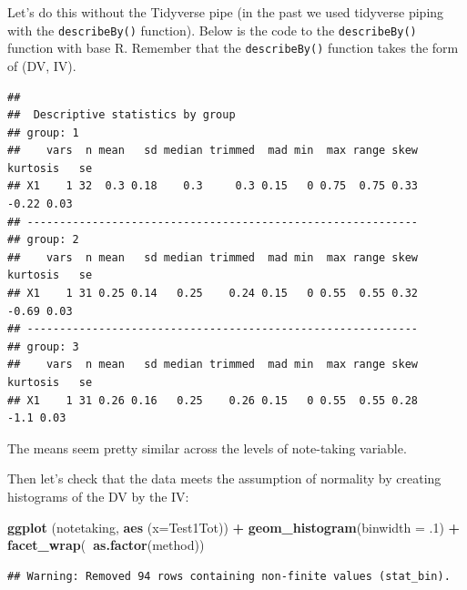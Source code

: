 \documentclass[
]{book}
\newenvironment{Shaded}{\begin{snugshade}}{\end{snugshade}}
\newcommand{\DataTypeTok}[1]{\textcolor[rgb]{0.13,0.29,0.53}{#1}}
\newcommand{\FloatTok}[1]{\textcolor[rgb]{0.00,0.00,0.81}{#1}}
\newcommand{\KeywordTok}[1]{\textcolor[rgb]{0.13,0.29,0.53}{\textbf{#1}}}
\newcommand{\NormalTok}[1]{#1}
\newcommand{\OperatorTok}[1]{\textcolor[rgb]{0.81,0.36,0.00}{\textbf{#1}}}
\newcommand{\StringTok}[1]{\textcolor[rgb]{0.31,0.60,0.02}{#1}}
\begin{document}
Let's do this without the Tidyverse pipe (in the past we used tidyverse piping with the \texttt{describeBy()} function). Below is the code to the \texttt{describeBy()} function with base R. Remember that the \texttt{describeBy()} function takes the form of (DV, IV).

\begin{Shaded}
\end{Shaded}

\begin{verbatim}
## 
##  Descriptive statistics by group 
## group: 1
##    vars  n mean   sd median trimmed  mad min  max range skew kurtosis   se
## X1    1 32  0.3 0.18    0.3     0.3 0.15   0 0.75  0.75 0.33    -0.22 0.03
## ------------------------------------------------------------ 
## group: 2
##    vars  n mean   sd median trimmed  mad min  max range skew kurtosis   se
## X1    1 31 0.25 0.14   0.25    0.24 0.15   0 0.55  0.55 0.32    -0.69 0.03
## ------------------------------------------------------------ 
## group: 3
##    vars  n mean   sd median trimmed  mad min  max range skew kurtosis   se
## X1    1 31 0.26 0.16   0.25    0.26 0.15   0 0.55  0.55 0.28     -1.1 0.03
\end{verbatim}

The means seem pretty similar across the levels of note-taking variable.

Then let's check that the data meets the assumption of normality by creating histograms of the DV by the IV:

\begin{Shaded}
\begin{Highlighting}[]
\KeywordTok{ggplot}\NormalTok{ (notetaking, }\KeywordTok{aes}\NormalTok{ (}\DataTypeTok{x=}\NormalTok{Test1Tot)) }\OperatorTok{+}
\StringTok{  }\KeywordTok{geom_histogram}\NormalTok{(}\DataTypeTok{binwidth =} \FloatTok{.1}\NormalTok{) }\OperatorTok{+}
\StringTok{  }\KeywordTok{facet_wrap}\NormalTok{(}\OperatorTok{~}\KeywordTok{as.factor}\NormalTok{(method))}
\end{Highlighting}
\end{Shaded}

\begin{verbatim}
## Warning: Removed 94 rows containing non-finite values (stat_bin).
\end{verbatim}
\end{document}
